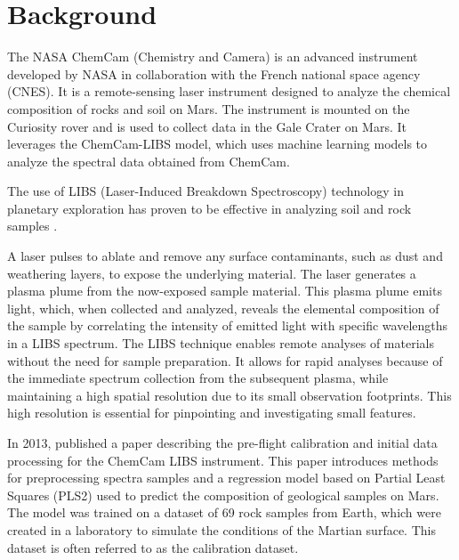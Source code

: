 \section{Background}


The NASA ChemCam (Chemistry and Camera) is an advanced instrument developed by NASA in collaboration with the French national space agency (CNES).
It is a remote-sensing laser instrument designed to analyze the chemical composition of rocks and soil on Mars\cite{chemcam_nasa_website}.
The instrument is mounted on the Curiosity rover and is used to collect data in the Gale Crater on Mars\cite{curiosity_nasa_website}.
It leverages the ChemCam-LIBS model, which uses machine learning models to analyze the spectral data obtained from ChemCam.\cite{andersonImprovedAccuracyQuantitative2017}\cite{cleggRecalibrationMarsScience2017}

The use of LIBS (Laser-Induced Breakdown Spectroscopy) technology in planetary exploration has proven to be effective in analyzing soil and rock samples \cite{knight_characterization_2000}.

A laser pulses to ablate and remove any surface contaminants, such as dust and weathering layers, to expose the underlying material.
The laser generates a plasma plume from the now-exposed sample material.
This plasma plume emits light, which, when collected and analyzed, reveals the elemental composition of the sample by correlating the intensity of emitted light with specific wavelengths in a LIBS spectrum.
The LIBS technique enables remote analyses of materials without the need for sample preparation.
It allows for rapid analyses because of the immediate spectrum collection from the subsequent plasma, while maintaining a high spatial resolution due to its small observation footprints.
This high resolution is essential for pinpointing and investigating small features. \cite{wiens_chemcam_2012}

In 2013, \citeauthor{wiens_pre-flight_2013} published a paper describing the pre-flight calibration and initial data processing for the ChemCam LIBS instrument.
This paper introduces methods for preprocessing spectra samples and a regression model based on Partial Least Squares (PLS2) used to predict the composition of geological samples on Mars.
The model was trained on a dataset of 69 rock samples from Earth, which were created in a laboratory to simulate the conditions of the Martian surface.
This dataset is often referred to as the calibration dataset.

